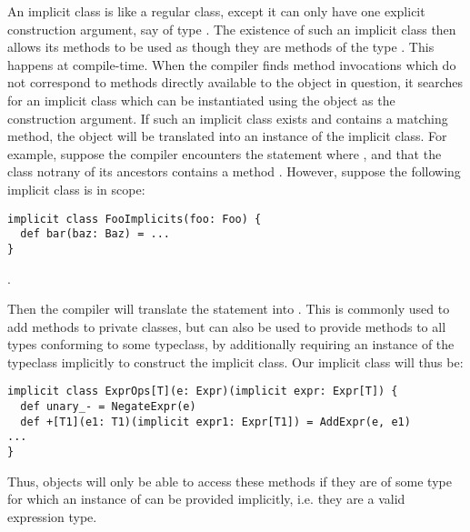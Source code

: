 An implicit class is like a regular class, except it can only have one explicit construction argument, say of type . The existence of such an implicit class then allows its methods to be used as though they are methods of the type . This happens at compile-time. When the compiler finds method invocations which do not correspond to methods directly available to the object in question, it searches for an implicit class which can be instantiated using the object as the construction argument. If such an implicit class exists and contains a matching method, the object will be translated into an instance of the implicit class.
For example, suppose the compiler encounters the statement  where , and that the class  notrany of its ancestors contains a method . However, suppose the following implicit class is in scope:
\vs\begin{lstlisting}
implicit class FooImplicits(foo: Foo) {
  def bar(baz: Baz) = ...
}
\end{lstlisting}\vs.

Then the compiler will translate the statement  into . This is commonly used to add methods to private classes, but can also be used to provide methods to all types conforming to some typeclass, by additionally requiring an instance of the typeclass implicitly to construct the implicit class. Our implicit class will thus be:
\vs \begin{lstlisting}
implicit class ExprOps[T](e: Expr)(implicit expr: Expr[T]) {
  def unary_- = NegateExpr(e)
  def +[T1](e1: T1)(implicit expr1: Expr[T1]) = AddExpr(e, e1)
...
}
\end{lstlisting} \vs
Thus, objects will only be able to access these methods if they are of some type  for which an instance of  can be provided implicitly, i.e. they are a valid expression type.


